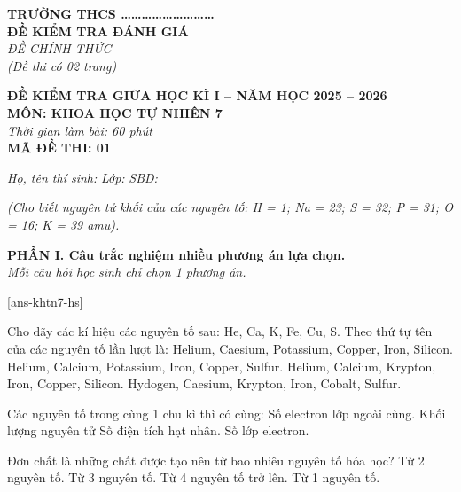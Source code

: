 \documentclass[11pt,a4paper]{article}
\begin{document}
\begin{minipage}[t]{0.45\textwidth}
\textbf{TRƯỜNG THCS \dots\dots\dots\dots\dots\dots\dots\dots\dots}\\
\textbf{ĐỀ KIỂM TRA ĐÁNH GIÁ}\\
\textit{ĐỀ CHÍNH THỨC}\\
\textit{(Đề thi có 02 trang)}
\end{minipage}
\hfill
\begin{minipage}[t]{0.52\textwidth}
\raggedleft
\textbf{\color{hfRed}ĐỀ KIỂM TRA GIỮA HỌC KÌ I -- NĂM HỌC 2025 -- 2026}\\
\textbf{MÔN: KHOA HỌC TỰ NHIÊN 7}\\
\textit{Thời gian làm bài: 60 phút}\\
\textbf{MÃ ĐỀ THI: 01}
\end{minipage}

\vspace{3pt}
\noindent
\textit{Họ, tên thí sinh:} \dotfill \textit{Lớp:} \dotfill \textit{SBD:} \dotfill

\vspace{2pt}
\noindent
\textit{\footnotesize (Cho biết nguyên tử khối của các nguyên tố: H = 1; Na = 23; S = 32; P = 31; O = 16; K = 39 amu).}


\vspace{3pt}
\noindent
\textbf{\color{mainGreen}PHẦN I. Câu trắc nghiệm nhiều phương án lựa chọn.}\\
\textit{Mỗi câu hỏi học sinh chỉ chọn 1 phương án.}

[ans-khtn7-hs]

\begin{ex}
Cho dãy các kí hiệu các nguyên tố sau: He, Ca, K, Fe, Cu, S. Theo thứ tự tên của các nguyên tố lần lượt là:
\choice
{Helium, Caesium, Potassium, Copper, Iron, Silicon.}
{\True Helium, Calcium, Potassium, Iron, Copper, Sulfur.}
{Helium, Calcium, Krypton, Iron, Copper, Silicon.}
{Hydogen, Caesium, Krypton, Iron, Cobalt, Sulfur.}
\end{ex}

\begin{ex}
Các nguyên tố trong cùng 1 chu kì thì có cùng:
\choice
{Số electron lớp ngoài cùng.}
{Khối lượng nguyên tử}
{Số điện tích hạt nhân.}
{\True Số lớp electron.}
\end{ex}

\begin{ex}
Đơn chất là những chất được tạo nên từ bao nhiêu nguyên tố hóa học?
\choice
{Từ 2 nguyên tố.}
{Từ 3 nguyên tố.}
{Từ 4 nguyên tố trở lên.}
{\True Từ 1 nguyên tố.}
\end{ex}
\end{document}
